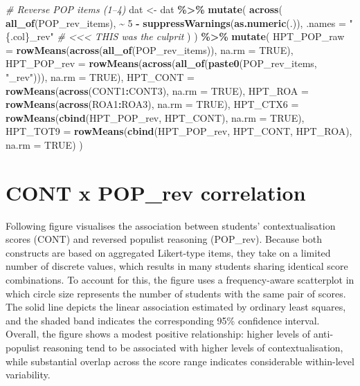 \documentclass[
  10pt,
]{article}
\newenvironment{Shaded}{\begin{snugshade}}{\end{snugshade}}
\newcommand{\AttributeTok}[1]{\textcolor[rgb]{0.13,0.29,0.53}{#1}}
\newcommand{\CommentTok}[1]{\textcolor[rgb]{0.56,0.35,0.01}{\textit{#1}}}
\newcommand{\ConstantTok}[1]{\textcolor[rgb]{0.56,0.35,0.01}{#1}}
\newcommand{\DecValTok}[1]{\textcolor[rgb]{0.00,0.00,0.81}{#1}}
\newcommand{\FunctionTok}[1]{\textcolor[rgb]{0.13,0.29,0.53}{\textbf{#1}}}
\newcommand{\NormalTok}[1]{#1}
\newcommand{\OtherTok}[1]{\textcolor[rgb]{0.56,0.35,0.01}{#1}}
\newcommand{\SpecialCharTok}[1]{\textcolor[rgb]{0.81,0.36,0.00}{\textbf{#1}}}
\newcommand{\StringTok}[1]{\textcolor[rgb]{0.31,0.60,0.02}{#1}}
\begin{document}
\begin{Shaded}
\begin{Highlighting}[]
\CommentTok{\# Reverse POP items (1–4)}
\NormalTok{dat }\OtherTok{\textless{}{-}}\NormalTok{ dat }\SpecialCharTok{\%\textgreater{}\%}
  \FunctionTok{mutate}\NormalTok{(}
    \FunctionTok{across}\NormalTok{(}
      \FunctionTok{all\_of}\NormalTok{(POP\_rev\_items),}
      \SpecialCharTok{\textasciitilde{}} \DecValTok{5} \SpecialCharTok{{-}} \FunctionTok{suppressWarnings}\NormalTok{(}\FunctionTok{as.numeric}\NormalTok{(.)),}
      \AttributeTok{.names =} \StringTok{"\{.col\}\_rev"}     \CommentTok{\# \textless{}\textless{}\textless{} THIS was the culprit}
\NormalTok{    )}
\NormalTok{  ) }\SpecialCharTok{\%\textgreater{}\%}
  \FunctionTok{mutate}\NormalTok{(}
    \AttributeTok{HPT\_POP\_raw =} \FunctionTok{rowMeans}\NormalTok{(}\FunctionTok{across}\NormalTok{(}\FunctionTok{all\_of}\NormalTok{(POP\_rev\_items)), }\AttributeTok{na.rm =} \ConstantTok{TRUE}\NormalTok{),}
    \AttributeTok{HPT\_POP\_rev =} \FunctionTok{rowMeans}\NormalTok{(}\FunctionTok{across}\NormalTok{(}\FunctionTok{all\_of}\NormalTok{(}\FunctionTok{paste0}\NormalTok{(POP\_rev\_items, }\StringTok{"\_rev"}\NormalTok{))), }\AttributeTok{na.rm =} \ConstantTok{TRUE}\NormalTok{),}
    \AttributeTok{HPT\_CONT    =} \FunctionTok{rowMeans}\NormalTok{(}\FunctionTok{across}\NormalTok{(CONT1}\SpecialCharTok{:}\NormalTok{CONT3), }\AttributeTok{na.rm =} \ConstantTok{TRUE}\NormalTok{),}
    \AttributeTok{HPT\_ROA     =} \FunctionTok{rowMeans}\NormalTok{(}\FunctionTok{across}\NormalTok{(ROA1}\SpecialCharTok{:}\NormalTok{ROA3),   }\AttributeTok{na.rm =} \ConstantTok{TRUE}\NormalTok{),}
    \AttributeTok{HPT\_CTX6    =} \FunctionTok{rowMeans}\NormalTok{(}\FunctionTok{cbind}\NormalTok{(HPT\_POP\_rev, HPT\_CONT), }\AttributeTok{na.rm =} \ConstantTok{TRUE}\NormalTok{),}
    \AttributeTok{HPT\_TOT9    =} \FunctionTok{rowMeans}\NormalTok{(}\FunctionTok{cbind}\NormalTok{(HPT\_POP\_rev, HPT\_CONT, HPT\_ROA), }\AttributeTok{na.rm =} \ConstantTok{TRUE}\NormalTok{)}
\NormalTok{  )}
\end{Highlighting}
\end{Shaded}

\hypertarget{cont-x-pop_rev-correlation}{%
\section{CONT x POP\_rev correlation}\label{cont-x-pop_rev-correlation}}

Following figure visualises the association between students'
contextualisation scores (CONT) and reversed populist reasoning
(POP\_rev). Because both constructs are based on aggregated Likert-type
items, they take on a limited number of discrete values, which results
in many students sharing identical score combinations. To account for
this, the figure uses a frequency-aware scatterplot in which circle size
represents the number of students with the same pair of scores. The
solid line depicts the linear association estimated by ordinary least
squares, and the shaded band indicates the corresponding 95\% confidence
interval. Overall, the figure shows a modest positive relationship:
higher levels of anti-populist reasoning tend to be associated with
higher levels of contextualisation, while substantial overlap across the
score range indicates considerable within-level variability.
\end{document}
